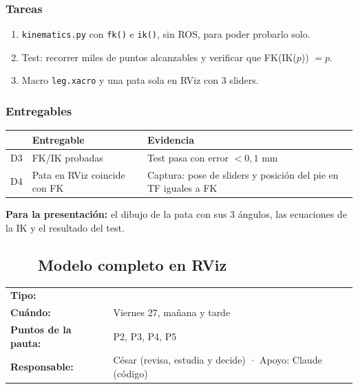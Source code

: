 \documentclass[11pt,a4paper]{article}
\makeatletter
\newcommand{\pill}[2]{{\setlength{\fboxsep}{1.6pt}\colorbox{#1}{\textcolor{white}{\footnotesize\bfseries\,#2\,}}}}
\newcommand{\Ed}{\pill{cModelo}{E2}}
\newcommand{\ficha}[4]{%
  \begin{tabularx}{\linewidth}{@{}l Y@{}}
  \textbf{Tipo:} & \pill{#1}{#2}\\
  \textbf{Cuándo:} & #3\\
  \textbf{Puntos de la pauta:} & #4\\
  \textbf{Responsable:} & César (revisa, estudia y decide) · Apoyo: Claude (código)\\
  \end{tabularx}\par}
\makeatother
\begin{document}
\subsubsection{Tareas}
\begin{enumerate}[label=T\arabic*]
  \item \texttt{kinematics.py} con \texttt{fk()} e \texttt{ik()}, sin ROS, para poder probarlo solo.
  \item Test: recorrer miles de puntos alcanzables y verificar que FK(IK($p$)) $= p$.
  \item Macro \texttt{leg.xacro} y una pata sola en RViz con 3 sliders.
\end{enumerate}

\subsubsection{Entregables}
\begin{tabularx}{\linewidth}{@{}l Y Y@{}}
\toprule \textbf{} & \textbf{Entregable} & \textbf{Evidencia}\\ \midrule
D3 & FK/IK probadas & Test pasa con error $< 0{,}1$ mm\\
D4 & Pata en RViz coincide con FK & Captura: pose de sliders y posición del pie en TF iguales a FK\\
\bottomrule
\end{tabularx}

\textbf{Para la presentación:} el dibujo de la pata con sus 3 ángulos, las ecuaciones de la IK y el resultado del test.

\subsection{\texorpdfstring{\Ed\ }{E2 }Modelo completo en RViz}
\ficha{cModelo}{Modelo}{Viernes 27, mañana y tarde}{P2, P3, P4, P5}
\end{document}
